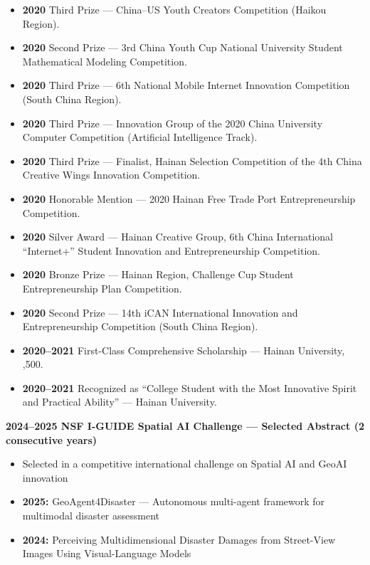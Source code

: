 \documentclass[10pt,letterpaper]{article}
\newcommand{\entry}[2]{%
  \par\vspace{0.30em}\noindent\textbf{#1}\hfill{\small #2}\par}
\newenvironment{tight}
  {\begin{itemize}[leftmargin=1.25em,itemsep=0.10em,topsep=0.20em,parsep=0pt,label=\textbullet]}
  {\end{itemize}}
\newenvironment{plainlist}
  {\begin{itemize}[leftmargin=1.1em,itemsep=0.10em,topsep=0.20em,parsep=0pt,label={}]}
  {\end{itemize}}
\newcommand{\dt}[1]{\textbf{#1}\hspace{0.6em}}
\begin{document}
\begin{plainlist}
  \item \dt{2020} Third Prize --- China--US Youth Creators Competition (Haikou Region).
  \item \dt{2020} Second Prize --- 3rd China Youth Cup National University Student Mathematical Modeling Competition.
  \item \dt{2020} Third Prize --- 6th National Mobile Internet Innovation Competition (South China Region).
  \item \dt{2020} Third Prize --- Innovation Group of the 2020 China University Computer Competition (Artificial Intelligence Track).
  \item \dt{2020} Third Prize --- Finalist, Hainan Selection Competition of the 4th China Creative Wings Innovation Competition.
  \item \dt{2020} Honorable Mention --- 2020 Hainan Free Trade Port Entrepreneurship Competition.
  \item \dt{2020} Silver Award --- Hainan Creative Group, 6th China International ``Internet+'' Student Innovation and Entrepreneurship Competition.
  \item \dt{2020} Bronze Prize --- Hainan Region, Challenge Cup Student Entrepreneurship Plan Competition.
  \item \dt{2020} Second Prize --- 14th iCAN International Innovation and Entrepreneurship Competition (South China Region).
  \item \dt{2020--2021} First-Class Comprehensive Scholarship --- Hainan University, ,500.
  \item \dt{2020--2021} Recognized as ``College Student with the Most Innovative Spirit and Practical Ability'' --- Hainan University.
\end{plainlist}

\vspace{0.4em}
\entry{2024--2025 NSF I-GUIDE Spatial AI Challenge --- Selected Abstract (2 consecutive years)}{}
\begin{tight}
  \item Selected in a competitive international challenge on Spatial AI and GeoAI innovation
  \item \textbf{2025:} GeoAgent4Disaster --- Autonomous multi-agent framework for multimodal disaster assessment
  \item \textbf{2024:} Perceiving Multidimensional Disaster Damages from Street-View Images Using Visual-Language Models
\end{tight}

\end{document}
